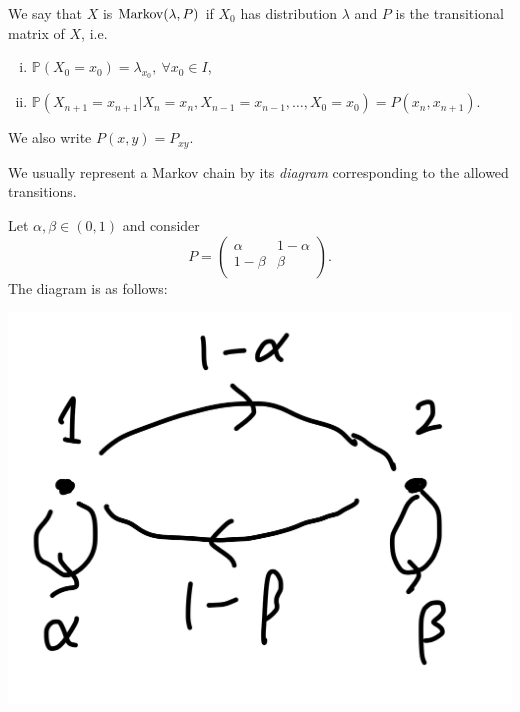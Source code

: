 \documentclass[a4paper,11pt]{article}
\begin{document}
\begin{definition}
    We say that $X$ is $ \operatorname{Markov}(\lambda,P) $ if $ X_0 $ has distribution $\lambda$ and $ P $ is the transitional matrix of $X$, i.e. 
    \begin{enumerate}[(i)]
        \item $ \mathbb{P}(X_0=x_0)=\lambda_{x_0},\ \forall x_0\in I $,
        \item $ \mathbb{P}(X_{n+1}=x_{n+1}|X_n=x_n, X_{n-1}=x_{n-1}, \dots, X_0=x_0) = P(x_{n},x_{n+1}) $.
    \end{enumerate}
\end{definition}
\begin{note}
    We also write $ P(x,y)=P_{xy} $.
\end{note}

We usually represent a Markov chain by its \textit{diagram} corresponding to the allowed transitions.
\begin{example}
    Let $ \alpha,\beta\in (0,1) $ and consider 
    \[
        P = \begin{pmatrix}
            \alpha & 1-\alpha \\
            1-\beta & \beta \\
        \end{pmatrix}.
    \]
    The diagram is as follows:
    \begin{center}
        \includegraphics[scale=0.07]{markov1.jpeg}
    \end{center}
\end{example}
\end{document}
